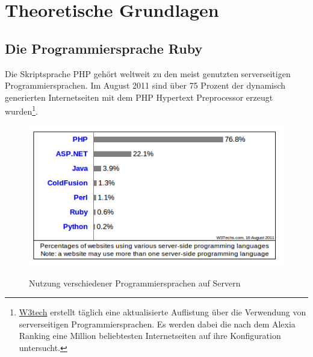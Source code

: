 \chapter{Theoretische Grundlagen}

\section{Die Programmiersprache Ruby}




Die Skriptsprache PHP gehört weltweit zu den meist genutzten serverseitigen Programmiersprachen. Im August 2011 sind über 75 Prozent der dynamisch generierten Internetseiten mit dem PHP Hypertext Preprocessor erzeugt wurden\footnote{\href{http://w3techs.com/}{W3tech} erstellt täglich eine aktualisierte Auflistung über die Verwendung von serverseitigen Programmiersprachen. Es werden dabei die nach dem Alexia Ranking eine Million beliebtesten Internetseiten auf ihre Konfiguration untersucht.}.

\begin{figure}[h]
\begin{center}
\label{fig.programmingusage}
\includegraphics[scale=0.65]{images/Einleitung/serverseitigeScriptsprachen.png}
\caption{Nutzung verschiedener Programmiersprachen auf Servern}
\end{center}
\end{figure}

